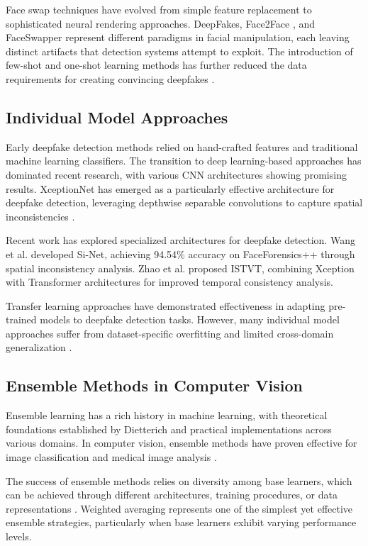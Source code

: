 \documentclass[conference]{IEEEtran}
\begin{document}
Face swap techniques have evolved from simple feature replacement to sophisticated neural rendering approaches. DeepFakes, Face2Face \cite{thies2016face2face}, and FaceSwapper represent different paradigms in facial manipulation, each leaving distinct artifacts that detection systems attempt to exploit. The introduction of few-shot and one-shot learning methods has further reduced the data requirements for creating convincing deepfakes \cite{zakharov2019few}.

\subsection{Individual Model Approaches}

Early deepfake detection methods relied on hand-crafted features and traditional machine learning classifiers. The transition to deep learning-based approaches has dominated recent research, with various CNN architectures showing promising results. XceptionNet has emerged as a particularly effective architecture for deepfake detection, leveraging depthwise separable convolutions to capture spatial inconsistencies \cite{rossler2020faceforensics}.

Recent work has explored specialized architectures for deepfake detection. Wang et al. \cite{wang2023si} developed Si-Net, achieving 94.54\% accuracy on FaceForensics++ through spatial inconsistency analysis. Zhao et al. \cite{zhao2023istvt} proposed ISTVT, combining Xception with Transformer architectures for improved temporal consistency analysis. 

Transfer learning approaches have demonstrated effectiveness in adapting pre-trained models to deepfake detection tasks. However, many individual model approaches suffer from dataset-specific overfitting and limited cross-domain generalization \cite{cozzolino2023audio}.

\subsection{Ensemble Methods in Computer Vision}

Ensemble learning has a rich history in machine learning, with theoretical foundations established by Dietterich \cite{dietterich2000ensemble} and practical implementations across various domains. In computer vision, ensemble methods have proven effective for image classification \cite{he2016deep} and medical image analysis \cite{esteva2017dermatologist}.

The success of ensemble methods relies on diversity among base learners, which can be achieved through different architectures, training procedures, or data representations \cite{kuncheva2003measures}. Weighted averaging represents one of the simplest yet effective ensemble strategies, particularly when base learners exhibit varying performance levels.
\end{document}
